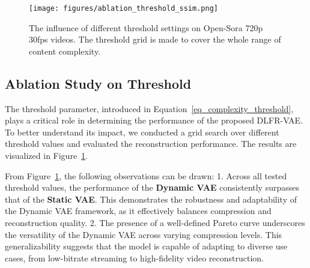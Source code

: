 \begin{figure}[!tb] %
    \centering
    \texttt{[image: figures/ablation\_threshold\_ssim.png]} %
\vspace{-0.2in}
    \caption{The influence of different threshold settings on Open-Sora 720p 30fps videos. The threshold grid is made to cover the whole range of content complexity.}
    \label{im_ablation_threshold}
\vspace{-0.2in}
\end{figure}

\subsection{Ablation Study on Threshold}







The threshold parameter, introduced in Equation~\ref{eq_complexity_threshold}, plays a critical role in determining the performance of the proposed DLFR-VAE. To better understand its impact, we conducted a grid search over different threshold values and evaluated the reconstruction performance. The results are visualized in Figure~\ref{im_ablation_threshold}.

From Figure~\ref{im_ablation_threshold}, the following observations can be drawn: 
1. Across all tested threshold values, the performance of the \textbf{Dynamic VAE} consistently surpasses that of the \textbf{Static VAE}. This demonstrates the robustness and adaptability of the Dynamic VAE framework, as it effectively balances compression and reconstruction quality.
2. The presence of a well-defined Pareto curve \cite{blanchet2022generalized} underscores the versatility of the Dynamic VAE across varying compression levels. This generalizability suggests that the model is capable of adapting to diverse use cases, from low-bitrate streaming to high-fidelity video reconstruction.

